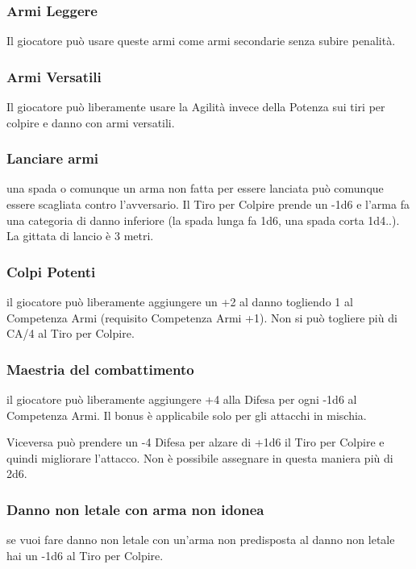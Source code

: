 \documentclass[a4paper,11pt,twoside,openany]{book}
\begin{document}
\subsubsection{Armi Leggere} Il giocatore può usare queste armi come armi secondarie senza subire penalità.

\subsubsection{Armi Versatili} Il giocatore può liberamente usare la Agilità invece della Potenza sui tiri per colpire e danno con armi versatili.

\subsubsection{Lanciare armi} una spada o comunque un arma non fatta per essere lanciata può comunque essere scagliata contro l'avversario.
Il Tiro per Colpire prende un -1d6 e l'arma fa una categoria di danno inferiore (la spada lunga fa 1d6, una spada corta 1d4..). La gittata di lancio è 3 metri.

\subsubsection{Colpi Potenti} il giocatore può liberamente aggiungere un +2 al danno togliendo 1 al Competenza Armi (requisito Competenza Armi +1). Non si può togliere più di CA/4 al Tiro per Colpire.

\subsubsection{Maestria del combattimento} il giocatore può liberamente aggiungere +4 alla Difesa per ogni -1d6 al Competenza Armi. Il bonus è applicabile solo per gli attacchi in mischia.

Viceversa può prendere un -4 Difesa per alzare di +1d6 il Tiro per Colpire e quindi migliorare l'attacco. Non è possibile assegnare in questa maniera più di 2d6.

\subsubsection{Danno non letale con arma non idonea} se vuoi fare danno non letale con un'arma non predisposta al danno non letale hai un -1d6 al Tiro per Colpire.
\end{document}
